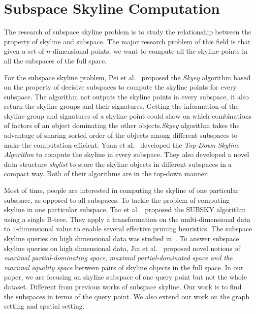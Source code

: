 \section{Subspace Skyline Computation}
\label{sec:rel:subspace}
The research of subspace skyline problem is to study the relationship between the property of skyline and subspace. The major research problem of this field is that given a set of $n$-dimensional points, we want to compute all the skyline points in all the subspaces of the full space.

For the subspace skyline problem, Pei et al.~\cite{pei2005catching} proposed the \emph{Skyey} algorithm based on the property of decisive subspaces to compute the skyline points for every subspace.  The algorithm not outputs the skyline points in every subspace, it also return the skyline groups and their signatures.
Getting the information of the skyline group and signatures of a skyline point could show on which combinations of factors of an object dominating the other objects.\emph{Skyey} algorithm takes the advantage of sharing sorted order of the objects among different subspaces to make the computation efficient. Yuan et al.~\cite{yuan2005efficient} developed the \emph{Top-Down Skyline Algorithm} to compute the skyline in every subspace. They also developed a novel data structure \emph{skylist} to store the skyline objects in different subspaces in a compact way. 
Both of their algorithms are in the top-down manner.

Most of time, people are interested in computing the skyline of one particular subspace, as opposed to all subspaces. To tackle the problem of computing skyline in one particular subspace, Tao et al.~\cite{tao2006subsky} proposed the SUBSKY algorithm using a single B-tree. They apply a transformation on the multi-dimensional data to $1$-dimensional value to enable several effective pruning heuristics.
The subspace skyline queries on high dimensional data was studied in~\cite{jin2007efficient}. To answer subspace skyline queries on high dimensional data, Jin et al.~\cite{jin2007efficient} proposed novel notions of \emph{maximal partial-dominating space}, \emph{maximal partial-dominated space and the maximal equality space} between pairs of skyline objects in the full space. In our paper, we are focusing on skyline subspace of one query point but not the whole dataset. Different from previous works of subspace skyline. Our work is to find the subspaces in terms of the query point. We also extend our work on the graph setting and spatial setting.


